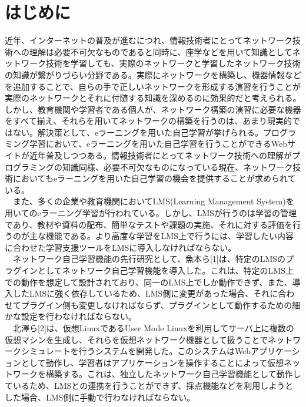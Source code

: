 \section{はじめに}
\label{tag:first}
近年、インターネットの普及が進むにつれ、情報技術者にとってネットワーク技術への理解は必要不可欠なものであると同時に、座学などを用いて知識としてネットワーク技術を学習しても、実際のネットワークと学習したネットワーク技術の知識が繋がりづらい分野である。実際にネットワークを構築し、機器情報などを追加することで、自らの手で正しいネットワークを形成する演習を行うことが実際のネットワークとそれに付随する知識を深めるのに効果的だと考えられる。しかし、教育機関や学習者である個人が、ネットワーク構築の演習に必要な機器をすべて揃え、それらを用いてネットワークの構築を行うのは、あまり現実的ではない。解決策として、eラーニングを用いた自己学習が挙げられる。プログラミング学習において、eラーニングを用いた自己学習を行うことができるWebサイトが近年普及しつつある。情報技術者にとってネットワーク技術への理解がプログラミングの知識同様、必要不可欠なものになっている現在、ネットワーク技術においてもeラーニングを用いた自己学習の機会を提供することが求められている。\\
　また、多くの企業や教育機関においてLMS(Learning Management System)を用いてのeラーニング学習が行われている。しかし、LMSが行うのは学習の管理であり、教材や資料の配布、簡単なテストや課題の実施、それに対する評価を行うのが主な機能である。より高度な学習をLMS上で行うには、学習したい内容に合わせた学習支援ツールをLMSに導入しなければならない。\\
　ネットワーク自己学習機能の先行研究として、魚本ら[1]は、特定のLMSのプラグインとしてネットワーク自己学習機能を導入した。これは、特定のLMS上での動作を想定して設計されており、同一のLMS上でしか動作できず、また、導入したLMSに強く依存しているため、LMS側に変更があった場合、それに合わせてプラグイン側も変更しなければならず、プラグインとして動作するための細かな設定を行わなければならない。\\
　北澤ら[2]は、仮想LinuxであるUser Mode Linuxを利用してサーバ上に複数の仮想マシンを生成し、それらを仮想ネットワーク機器として扱うことでネットワークシミュレートを行うシステムを開発した。このシステムはWebアプリケーションとして動作し、学習者はアプリケーションを操作することによって仮想ネットワークを構築する。これは、独立したネットワーク自己学習機能として動作しているため、LMSとの連携を行うことができず、採点機能などを利用しようとした場合、LMS側に手動で行わなければならない。

